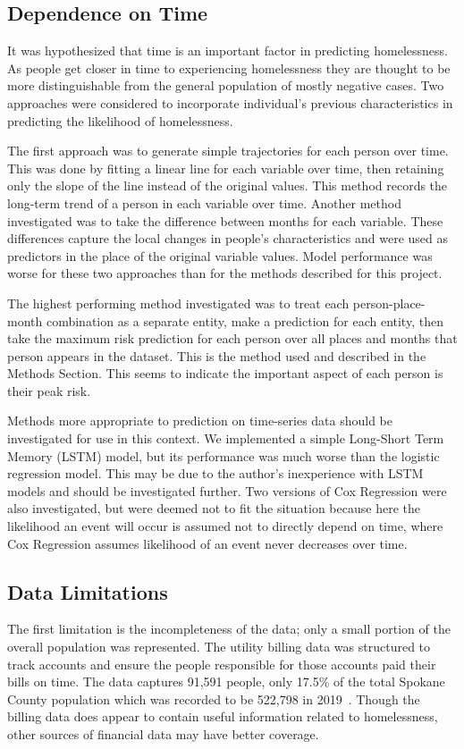 \documentclass[10pt,letterpaper]{article}
\begin{document}
\subsection*{Dependence on Time}
It was hypothesized that time is an important factor in predicting homelessness. As people get closer in time to experiencing homelessness they are thought to be more distinguishable from the general population of mostly negative cases. Two approaches were considered to incorporate individual's previous characteristics in predicting the likelihood of homelessness.

The first approach was to generate simple trajectories for each person over time. This was done by fitting a linear line for each variable over time, then retaining only the slope of the line instead of the original values. This method records the long-term trend of a person in each variable over time. Another method investigated was to take the difference between months for each variable. These differences capture the local changes in people's characteristics and were used as predictors in the place of the original variable values. Model performance was worse for these two approaches than for the methods described for this project.

The highest performing method investigated was to treat each person-place-month combination as a separate entity, make a prediction for each entity, then take the maximum risk prediction for each person over all places and months that person appears in the dataset. This is the method used and described in the Methods Section. This seems to indicate the important aspect of each person is their peak risk. 

Methods more appropriate to prediction on time-series data should be investigated for use in this context. We implemented a simple Long-Short Term Memory (LSTM) model, but its performance was much worse than the logistic regression model. This may be due to the author's inexperience with LSTM models and should be investigated further. Two versions of Cox Regression were also investigated, but were deemed not to fit the situation because here the likelihood an event will occur is assumed not to directly depend on time, where Cox Regression assumes likelihood of an event never decreases over time.

\subsection*{Data Limitations}
The first limitation is the incompleteness of the data; only a small portion of the overall population was represented. The utility billing data was structured to track accounts and ensure the people responsible for those accounts paid their bills on time. The data captures 91,591 people, only 17.5\% of the total Spokane County population which was recorded to be 522,798 in 2019~\cite{SpokanePop}. Though the billing data does appear to contain useful information related to homelessness, other sources of financial data may have better coverage.
\end{document}
